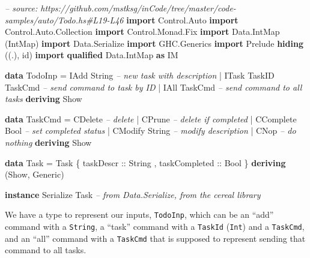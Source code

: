\documentclass[]{article}
\newenvironment{Shaded}{}{}
\newcommand{\CommentTok}[1]{\textcolor[rgb]{0.38,0.63,0.69}{\textit{#1}}}
\newcommand{\DataTypeTok}[1]{\textcolor[rgb]{0.56,0.13,0.00}{#1}}
\newcommand{\FunctionTok}[1]{\textcolor[rgb]{0.02,0.16,0.49}{#1}}
\newcommand{\KeywordTok}[1]{\textcolor[rgb]{0.00,0.44,0.13}{\textbf{#1}}}
\newcommand{\NormalTok}[1]{#1}
\newcommand{\OtherTok}[1]{\textcolor[rgb]{0.00,0.44,0.13}{#1}}
\begin{document}
\begin{Shaded}
\begin{Highlighting}[]
\CommentTok{-- source: https://github.com/mstksg/inCode/tree/master/code-samples/auto/Todo.hs#L19-L46}
\KeywordTok{import} \DataTypeTok{Control.Auto}
\KeywordTok{import} \DataTypeTok{Control.Auto.Collection}
\KeywordTok{import} \DataTypeTok{Control.Monad.Fix}
\KeywordTok{import} \DataTypeTok{Data.IntMap}\NormalTok{             (}\DataTypeTok{IntMap}\NormalTok{)}
\KeywordTok{import} \DataTypeTok{Data.Serialize}
\KeywordTok{import} \DataTypeTok{GHC.Generics}
\KeywordTok{import} \DataTypeTok{Prelude} \KeywordTok{hiding}\NormalTok{          ((.), id)}
\KeywordTok{import} \KeywordTok{qualified} \DataTypeTok{Data.IntMap}   \KeywordTok{as} \DataTypeTok{IM}

\KeywordTok{data} \DataTypeTok{TodoInp} \FunctionTok{=} \DataTypeTok{IAdd}  \DataTypeTok{String}           \CommentTok{-- new task with description}
             \FunctionTok{|} \DataTypeTok{ITask} \DataTypeTok{TaskID} \DataTypeTok{TaskCmd}   \CommentTok{-- send command to task by ID}
             \FunctionTok{|} \DataTypeTok{IAll} \DataTypeTok{TaskCmd}           \CommentTok{-- send command to all tasks}
             \KeywordTok{deriving} \DataTypeTok{Show}

\KeywordTok{data} \DataTypeTok{TaskCmd} \FunctionTok{=} \DataTypeTok{CDelete}          \CommentTok{-- delete}
             \FunctionTok{|} \DataTypeTok{CPrune}           \CommentTok{-- delete if completed}
             \FunctionTok{|} \DataTypeTok{CComplete} \DataTypeTok{Bool}   \CommentTok{-- set completed status}
             \FunctionTok{|} \DataTypeTok{CModify} \DataTypeTok{String}   \CommentTok{-- modify description}
             \FunctionTok{|} \DataTypeTok{CNop}             \CommentTok{-- do nothing}
             \KeywordTok{deriving} \DataTypeTok{Show}

\KeywordTok{data} \DataTypeTok{Task} \FunctionTok{=} \DataTypeTok{Task}\NormalTok{ \{}\OtherTok{ taskDescr     ::} \DataTypeTok{String}
\NormalTok{                 ,}\OtherTok{ taskCompleted ::} \DataTypeTok{Bool}
\NormalTok{                 \} }\KeywordTok{deriving}\NormalTok{ (}\DataTypeTok{Show}\NormalTok{, }\DataTypeTok{Generic}\NormalTok{)}

\KeywordTok{instance} \DataTypeTok{Serialize} \DataTypeTok{Task} \CommentTok{-- from Data.Serialize, from the cereal library}
\end{Highlighting}
\end{Shaded}

We have a type to represent our inputs, \texttt{TodoInp}, which can be an
``add'' command with a \texttt{String}, a ``task'' command with a
\texttt{TaskId} (\texttt{Int}) and a \texttt{TaskCmd}, and an ``all'' command
with a \texttt{TaskCmd} that is supposed to represent sending that command to
all tasks.
\end{document}
